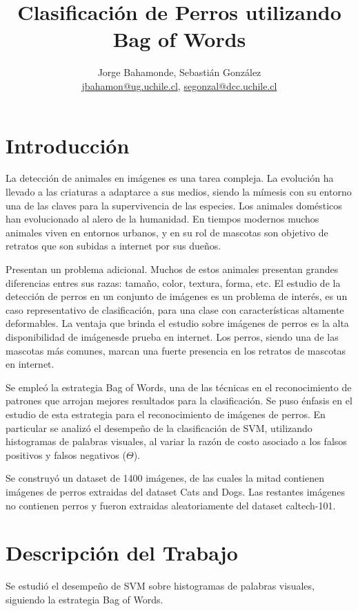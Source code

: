 \documentclass[12pt]{article}
\title{Clasificación de Perros utilizando Bag of Words}
\author{Jorge Bahamonde, Sebastián González\\
\small{\url{jbahamon@ug.uchile.cl}, \url{segonzal@dcc.uchile.cl}}}
\date{}
\begin{document}
\maketitle

\section{Introducción}

La detección de animales en imágenes es una tarea compleja. La evolución ha llevado a
las criaturas a adaptarce a sus medios, siendo la mímesis con su entorno una de las claves para la supervivencia de las especies.
Los animales domésticos han evolucionado al alero de la humanidad. En tiempos modernos muchos animales viven en entornos urbanos,
y en su rol de mascotas son objetivo de retratos que son subidas a internet por sus dueños.

Presentan un problema adicional. Muchos de estos animales presentan grandes diferencias entres sus razas: tamaño, color, textura, forma, etc.
El estudio de la detección de perros en un conjunto de imágenes es un problema de interés, es un caso representativo de clasificación, para una clase con características
altamente deformables. La ventaja que brinda el estudio sobre imágenes de perros es la alta disponibilidad de imágenesde prueba en internet.
Los perros, siendo una de las mascotas más comunes, marcan una fuerte presencia en los retratos de mascotas en internet.

Se empleó la estrategia Bag of Words, una de las técnicas en el reconocimiento de patrones que arrojan mejores resultados para la clasificación.
Se puso énfasis en el estudio de esta estrategia para el reconocimiento de imágenes de perros. En particular se analizó el desempeño de la clasificación de SVM,
utilizando histogramas de palabras visuales, al variar la razón de costo asociado a los falsos positivos y falsos negativos ($\Theta$).

Se construyó un dataset de 1400 imágenes, de las cuales la mitad contienen imágenes de perros extraidas del dataset Cats and Dogs.
Las restantes imágenes no contienen perros y fueron extraidas aleatoriamente del dataset caltech-101.

\section{Descripción del Trabajo}

Se estudió el desempeño de SVM sobre histogramas de palabras visuales, siguiendo la estrategia Bag of Words.
\end{document}
